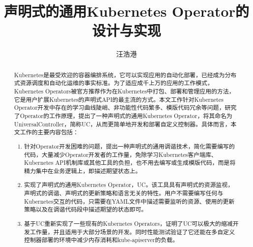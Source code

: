 \documentclass[macfonts,master]{njuthesis}
\title{声明式的通用Kubernetes Operator的设计与实现}
\author{汪浩港}
\institute{南京大学}
\begin{document}

\maketitle
\makeenglishtitle


\frontmatter

\begin{abstract}
Kubernetes是最受欢迎的容器编排系统，它可以实现应用的自动化部署，已经成为分布式资源调度和自动化运维的事实标准。为了适应成千上万的应用的工作模式，Kubernetes Operators被官方推荐作为在Kubernetes中打包、部署和管理应用的方法，它是用户扩展Kubernetes的声明式API的最主流的方式。本文工作针对Kubernetes Operator开发中存在的学习曲线陡峭、非功能性代码繁多、模版代码冗余等问题，研究了Operator的工作原理，提出了一种声明式的通用Kubernetes Operator，将其命名为UniversalController，简称UC，从而更简单地开发和部署自定义控制器。具体而言，本文工作的主要内容包括：
\begin{enumerate}
	\item 针对Operator开发困难的问题，提出一种声明式的通用调谐技术，简化需要编写的代码，大量减少Operator开发者的工作量，免除学习Kubernetes客户端库、Kubernetes API机制库或其他工具的负担，也不用去编写或生成模版代码，而是将精力集中在业务逻辑上，即描述期望状态上。
	\item 实现了声明式的通用Kubernetes Operator，UC。该工具具有声明式的资源监视，声明式的调谐、声明式的更新策略和语言无关的特性。用户不需要编写任何与Kubernetes交互的代码，只需要在YAML文件中描述需要监听的资源、使用的更新策略以及在调谐代码段中描述期望的状态即可。
	\item 基于UC重新实现了一些现有的Kubernetes Operators，证明了UC可以极大的缩减开发工作量，并且适用于大部分场景的开发。同时性能测试验证了它还能在多自定义控制器部署的环境中减少内存消耗和kube-apiserver的负载。
\end{enumerate}

\end{abstract}
\end{document}

